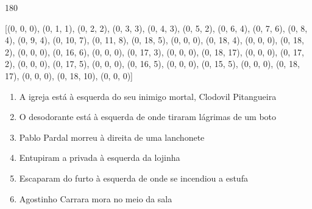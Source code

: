 \documentclass[12pt]{article}
\begin{document}
\pagebreak

	\begin{turn}{180}	
		\begin{minipage}{\textwidth}[(0, 0, 0), (0, 1, 1), (0, 2, 2), (0, 3, 3), (0, 4, 3), (0, 5, 2), (0, 6, 4), (0, 7, 6), (0, 8, 4), (0, 9, 4), (0, 10, 7), (0, 11, 8), (0, 18, 5), (0, 0, 0), (0, 18, 4), (0, 0, 0), (0, 18, 2), (0, 0, 0), (0, 16, 6), (0, 0, 0), (0, 17, 3), (0, 0, 0), (0, 18, 17), (0, 0, 0), (0, 17, 2), (0, 0, 0), (0, 17, 5), (0, 0, 0), (0, 16, 5), (0, 0, 0), (0, 15, 5), (0, 0, 0), (0, 18, 17), (0, 0, 0), (0, 18, 10), (0, 0, 0)]	  
				
		\end{minipage}	
	\end{turn} 

\pagebreak
\sffamily
\large

	\begin{enumerate}


\vfill \item
A igreja está	%
à esquerda
do seu inimigo mortal, Clodovil Pitangueira	%

\vfill \item
O desodorante está	%
à esquerda
de onde tiraram lágrimas de um boto	%

\vfill \item
Pablo Pardal morreu	%
à direita
de uma lanchonete	%

\vfill \item
Entupiram a privada	%
à esquerda
da lojinha	%

\vfill \item
Escaparam do furto	%
à esquerda
de onde se incendiou a estufa	%

\vfill \item
Agostinho Carrara mora	%
no meio da sala	%
	\end{enumerate}
\end{document}

